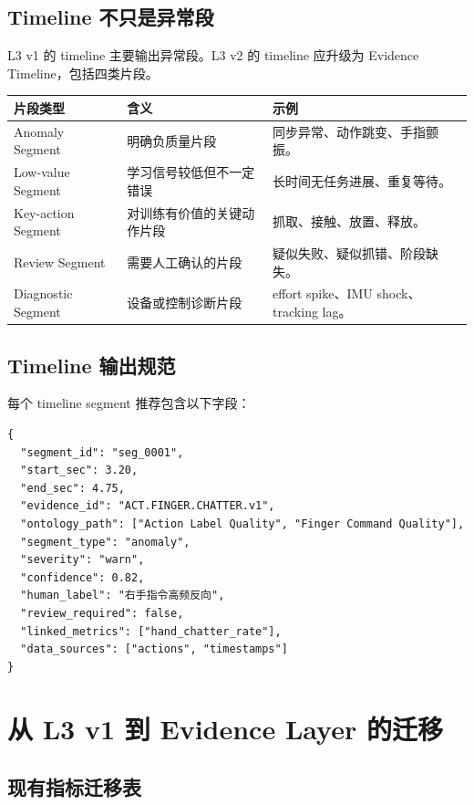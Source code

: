 \documentclass[UTF8,zihao=-4,oneside,openany]{ctexrep}
\begin{document}
\subsection{Timeline 不只是异常段}

L3 v1 的 timeline 主要输出异常段。L3 v2 的 timeline 应升级为 Evidence Timeline，包括四类片段。

\begin{longtable}{L{3cm} L{4.8cm} L{5.9cm}}
\toprule
片段类型 & 含义 & 示例 \\
\midrule
Anomaly Segment & 明确负质量片段 & 同步异常、动作跳变、手指颤振。 \\
Low-value Segment & 学习信号较低但不一定错误 & 长时间无任务进展、重复等待。 \\
Key-action Segment & 对训练有价值的关键动作片段 & 抓取、接触、放置、释放。 \\
Review Segment & 需要人工确认的片段 & 疑似失败、疑似抓错、阶段缺失。 \\
Diagnostic Segment & 设备或控制诊断片段 & effort spike、IMU shock、tracking lag。 \\
\bottomrule
\end{longtable}

\subsection{Timeline 输出规范}

每个 timeline segment 推荐包含以下字段：

\begin{verbatim}
{
  "segment_id": "seg_0001",
  "start_sec": 3.20,
  "end_sec": 4.75,
  "evidence_id": "ACT.FINGER.CHATTER.v1",
  "ontology_path": ["Action Label Quality", "Finger Command Quality"],
  "segment_type": "anomaly",
  "severity": "warn",
  "confidence": 0.82,
  "human_label": "右手指令高频反向",
  "review_required": false,
  "linked_metrics": ["hand_chatter_rate"],
  "data_sources": ["actions", "timestamps"]
}
\end{verbatim}

\section{从 L3 v1 到 Evidence Layer 的迁移}

\subsection{现有指标迁移表}
\end{document}
